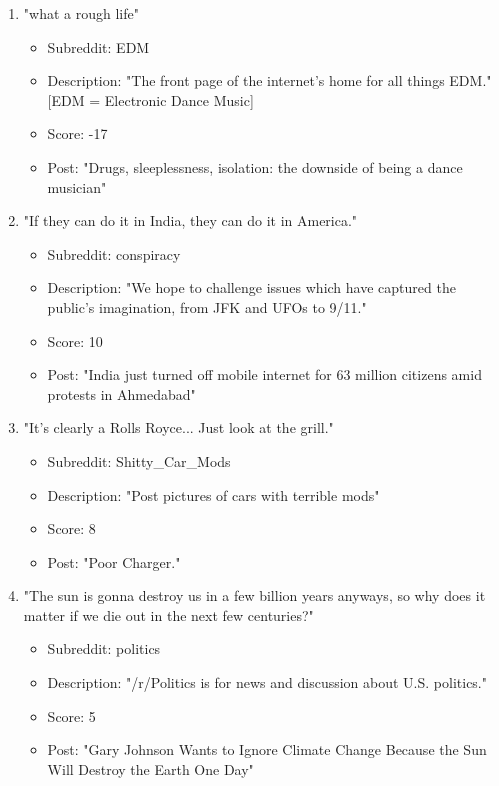 \documentclass[a4paper,12pt]{article}
\begin{document}
\begin{enumerate}
	\item "what a rough life"
	\begin{itemize}
		\item Subreddit: EDM
		\item Description: "The front page of the internet's home for all things EDM."  [EDM = Electronic Dance Music]
		\item Score: -17
		\item Post: "Drugs, sleeplessness, isolation: the downside of being a dance musician"
	\end{itemize}

	\item "If they can do it in India, they can do it in America."
	\begin{itemize}
		\item Subreddit: conspiracy
		\item Description: "We hope to challenge issues which have captured the public’s imagination, from JFK and UFOs to 9/11."
		\item Score: 10
		\item Post: "India just turned off mobile internet for 63 million citizens amid protests in Ahmedabad"
	\end{itemize}

	\item "It's clearly a Rolls Royce... Just look at the grill."
	\begin{itemize}
		\item Subreddit: Shitty\_Car\_Mods
		\item Description: "Post pictures of cars with terrible mods"
		\item Score: 8
		\item Post: "Poor Charger."
	\end{itemize}

	\item "The sun is gonna destroy us in a few billion years anyways, so why does it matter if we die out in the next few centuries?"
	\begin{itemize}
		\item Subreddit: politics
		\item Description: "/r/Politics is for news and discussion about U.S. politics."
		\item Score: 5
		\item Post: "Gary Johnson Wants to Ignore Climate Change Because the Sun Will Destroy the Earth One Day"
	\end{itemize}


\end{enumerate}
\end{document}
